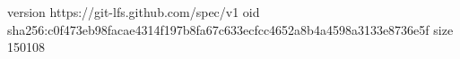 version https://git-lfs.github.com/spec/v1
oid sha256:c0f473eb98facae4314f197b8fa67c633ecfcc4652a8b4a4598a3133e8736e5f
size 150108
